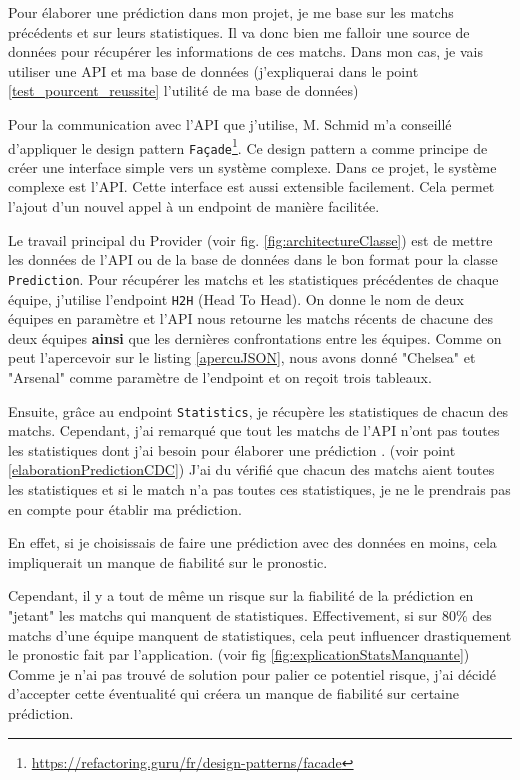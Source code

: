 \documentclass[a4paper,14pt]{extarticle}
\begin{document}
{Pour élaborer une prédiction dans mon projet, je me base sur les matchs précédents et sur leurs statistiques. Il va donc bien me falloir une source de données pour récupérer les informations de ces matchs. Dans mon cas, je vais utiliser une API et ma base de données (j'expliquerai dans le point \ref{test_pourcent_reussite} l'utilité de ma base de données)

Pour la communication avec l'API que j'utilise, M. Schmid m'a conseillé d'appliquer le design pattern \texttt{Façade}\footnote{\url{https://refactoring.guru/fr/design-patterns/facade}}. Ce design pattern a comme principe de créer une interface simple vers un système complexe. Dans ce projet, le système complexe est l'API. Cette interface est aussi extensible facilement. Cela permet l'ajout d'un nouvel appel à un endpoint de manière facilitée. 

Le travail principal du Provider (voir fig. \ref{fig:architectureClasse}) est de mettre les données de l'API ou de la base de données dans le bon format pour la classe \texttt{Prediction}.
Pour récupérer les matchs et les statistiques précédentes de chaque équipe, j'utilise l'endpoint \texttt{H2H} (Head To Head). On donne le nom de deux équipes en paramètre et l'API nous retourne les matchs récents de chacune des deux équipes \textbf{ainsi} que les dernières confrontations entre les équipes. 
Comme on peut l'apercevoir sur le listing \ref{apercuJSON}, nous avons donné "Chelsea" et "Arsenal" comme paramètre de l'endpoint et on reçoit trois tableaux.

Ensuite, grâce au endpoint \texttt{Statistics}, je récupère les statistiques de chacun des matchs. Cependant, j'ai remarqué que tout les matchs de l'API n'ont pas toutes les statistiques dont j'ai besoin pour élaborer une prédiction . (voir point \ref{elaborationPredictionCDC}) J'ai du vérifié que chacun des matchs aient toutes les statistiques et si le match n'a pas toutes ces statistiques, je ne le prendrais pas en compte pour établir ma prédiction.

En effet, si je choisissais de faire une prédiction avec des données en moins, cela impliquerait un manque de fiabilité sur le pronostic. 

Cependant, il y a tout de même un risque sur la fiabilité de la prédiction en "jetant" les matchs qui manquent de statistiques. Effectivement, si sur 80\% des matchs d'une équipe manquent de statistiques, cela peut influencer drastiquement le pronostic fait par l'application. (voir fig \ref{fig:explicationStatsManquante}) Comme je n'ai pas trouvé de solution pour palier ce potentiel risque, j'ai décidé d'accepter cette éventualité qui créera un manque de fiabilité sur certaine prédiction.

}
\end{document}
